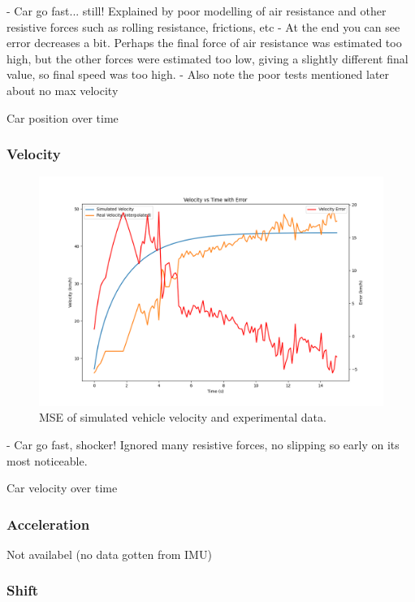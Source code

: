 \documentclass[12pt, titlepage]{article}
\begin{document}
- Car go fast... still! Explained by poor modelling of air resistance and other resistive forces such as rolling resistance, frictions, etc
- At the end you can see error decreases a bit. Perhaps the final force of air resistance was estimated too high, but the other forces were estimated too low, giving a slightly different final value, so final speed was too high.
- Also note the poor tests mentioned later about no max velocity

Car position over time

\subsubsection{Velocity}

\begin{figure}[H]
  \begin{center}
   \includegraphics[width=\textwidth]{MSE Graphs/speed.png}
  \caption{MSE of simulated vehicle velocity and experimental data.}
  \label{Fig_Velocity} 
  \end{center}
\end{figure}

- Car go fast, shocker! Ignored many resistive forces, no slipping so early on its most noticeable.

Car velocity over time

\subsubsection{Acceleration}

Not availabel (no data gotten from IMU)

\subsubsection{Shift}
\end{document}
